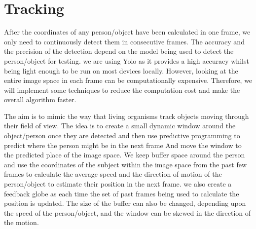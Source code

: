\section{Tracking}

After the coordinates of any person/object have been calculated in one frame, we only need to continuously detect them in consecutive frames. The accuracy and the precision of the detection depend on the model being used to detect the person/object for testing. we are using Yolo as it provides a high accuracy whilst being light enough to be run on most devices locally. However, looking at the entire image space in each frame can be computationally expensive. Therefore, we will implement some techniques to reduce the computation cost and make the overall algorithm faster.\newline

The aim is to mimic the way that living organisms track objects moving through their field of view. The idea is to create a small dynamic window around the object/person once they are detected and then use predictive programming to predict where the person might be in the next frame And move the window to the predicted place of the image space. We keep buffer space around the person and use the coordinates of the subject within the image space from the past few frames to calculate the average speed and the direction of motion of the person/object to estimate their position in the next frame. we also create a feedback globe as each time the set of past frames being used to calculate the position is updated. The size of the buffer can also be changed, depending upon the speed of the person/object, and the window can be skewed in the direction of the motion.\newline
